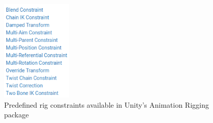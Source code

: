 \begin{figure}
    \centering
    \includegraphics[width=0.3\textwidth]{grafika/ar_constraints.png}
    \caption{Predefined rig constraints available in Unity's Animation Rigging
    package \cite{ar_constraints}}
    \label{fig:ar_constraints}
\end{figure}

